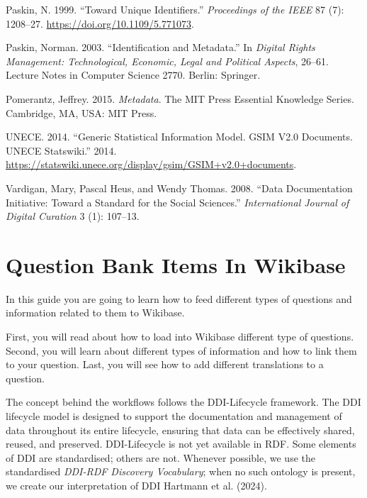 \documentclass[
  letterpaper,
  DIV=11,
  numbers=noendperiod]{scrreprt}
\newlength{\cslhangindent}
\newenvironment{CSLReferences}[2] %
 {\begin{list}{}{%
  \setlength{\itemindent}{0pt}
  \setlength{\leftmargin}{0pt}
  \setlength{\parsep}{0pt}
  \ifodd #1
   \setlength{\leftmargin}{\cslhangindent}
   \setlength{\itemindent}{-1\cslhangindent}
  \fi
  \setlength{\itemsep}{#2\baselineskip}}}
 {\end{list}}
\begin{document}
\begin{CSLReferences}{1}{0}
Paskin, N. 1999. {``Toward Unique Identifiers.''} \emph{Proceedings of
the {IEEE}} 87 (7): 1208--27. \url{https://doi.org/10.1109/5.771073}.

Paskin, Norman. 2003. {``Identification and Metadata.''} In
\emph{Digital Rights Management: Technological, Economic, Legal and
Political Aspects}, 26--61. Lecture Notes in Computer Science 2770.
Berlin: Springer.

Pomerantz, Jeffrey. 2015. \emph{Metadata}. The {MIT} Press Essential
Knowledge Series. Cambridge, {MA}, {USA}: {MIT} Press.

UNECE. 2014. {``Generic Statistical Information Model. {GSIM} V2.0
Documents. {UNECE} Statswiki.''} 2014.
\url{https://statswiki.unece.org/display/gsim/GSIM+v2.0+documents}.

Vardigan, Mary, Pascal Heus, and Wendy Thomas. 2008. {``Data
Documentation Initiative: Toward a Standard for the Social Sciences.''}
\emph{International Journal of Digital Curation} 3 (1): 107--13.

\end{CSLReferences}

\cleardoublepage
{}
{}
\appendix

\chapter{Question Bank Items In Wikibase}\label{sec-questionbank}

In this guide you are going to learn how to feed different types of
questions and information related to them to Wikibase.

First, you will read about how to load into Wikibase different type of
questions. Second, you will learn about different types of information
and how to link them to your question. Last, you will see how to add
different translations to a question.

The concept behind the workflows follows the DDI-Lifecycle framework.
The DDI lifecycle model is designed to support the documentation and
management of data throughout its entire lifecycle, ensuring that data
can be effectively shared, reused, and preserved. DDI-Lifecycle is not
yet available in RDF. Some elements of DDI are standardised; others are
not. Whenever possible, we use the standardised \emph{DDI-RDF Discovery
Vocabulary}; when no such ontology is present, we create our
interpretation of DDI Hartmann et al. (2024).
\end{document}
